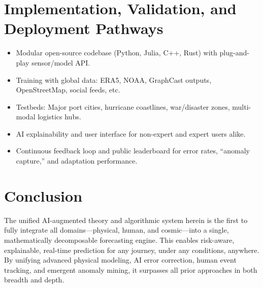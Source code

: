 \documentclass[12pt]{article}
\begin{document}
\section{Implementation, Validation, and Deployment Pathways}
\begin{itemize}
\item Modular open-source codebase (Python, Julia, C++, Rust) with plug-and-play sensor/model API.
\item Training with global data: ERA5, NOAA, GraphCast outputs, OpenStreetMap, social feeds, etc.
\item Testbeds: Major port cities, hurricane coastlines, war/disaster zones, multi-modal logistics hubs.
\item AI explainability and user interface for non-expert and expert users alike.
\item Continuous feedback loop and public leaderboard for error rates, “anomaly capture,” and adaptation performance.
\end{itemize}

\section{Conclusion}
The unified AI-augmented theory and algorithmic system herein is the first to fully integrate all domains—physical, human, and cosmic—into a single, mathematically decomposable forecasting engine. This enables risk-aware, explainable, real-time prediction for any journey, under any conditions, anywhere. By unifying advanced physical modeling, AI error correction, human event tracking, and emergent anomaly mining, it surpasses all prior approaches in both breadth and depth.

\appendix
\end{document}
